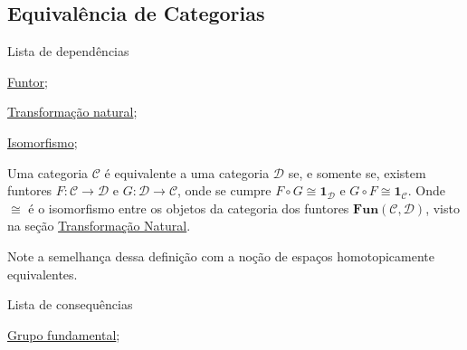 \subsection{Equivalência de Categorias}
\label{equivalência-de-categorias-def}
\begin{titlemize}{Lista de dependências}
	\item \hyperref[funtor-categorias-def]{Funtor};\\ %
	\item \hyperref[transformação-natural-categorias-def]{Transformação natural};\\
  \item \hyperref[isomorfismo-em-categorias-def]{Isomorfismo};\\
\end{titlemize}
\begin{defi}
	Uma categoria $\mathcal{C}$ é equivalente a uma categoria $\mathcal{D}$ se, e somente se, existem funtores $F: \mathcal{C} \longrightarrow \mathcal{D}$ e $G: \mathcal{D} \longrightarrow \mathcal{C}$, onde se cumpre $F \circ G \cong \mathbf{1}_\mathcal{D}$ e $G \circ F \cong \mathbf{1}_\mathcal{C}$.
 Onde $\cong$ é o isomorfismo entre os objetos da categoria dos funtores $\mathbf{Fun(\mathcal{C}, \mathcal{D})}$, visto na seção \hyperref[transformação-natural-categorias-def]{Transformação Natural}.
\end{defi}

Note a semelhança dessa definição com a noção de espaços homotopicamente equivalentes.

\begin{titlemize}{Lista de consequências}
	\item \hyperref[grupo-fundamental]{Grupo fundamental};\\ %
\end{titlemize}

